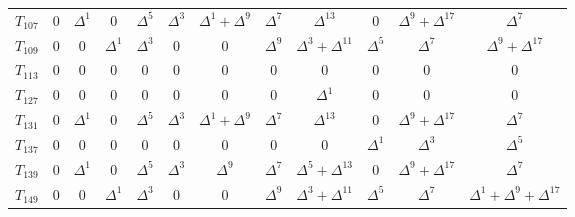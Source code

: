 \begin{center}
\begin{tabular}{|c|ccccccccccc|}
	$T_{107}$ & 0 & $\Delta^1$ & 0 & $\Delta^5$ & $\Delta^3$ & $\Delta^1 + \Delta^9$ & $\Delta^7$ & $\Delta^{13}$ & 0 & $\Delta^9 + \Delta^{17}$ 
	& $\Delta^7$ \\
	$T_{109}$ & 0 & 0 & $\Delta^1$ & $\Delta^3$ & 0 & 0 & $\Delta^9$ & $\Delta^3 + \Delta^{11}$ & $\Delta^5$ & $\Delta^7$ & $\Delta^9 + \Delta^{17}$ \\
	$T_{113}$ & 0 & 0 & 0 & 0 & 0 & 0 & 0 & 0 & 0 & 0 & 0 \\
	$T_{127}$ & 0 & 0 & 0 & 0 & 0 & 0 & 0 & $\Delta^1$ & 0 & 0 & 0 \\
	$T_{131}$ & 0 & $\Delta^1$ & 0 & $\Delta^5$ & $\Delta^3$ & $\Delta^1 + \Delta^9$ & $\Delta^7$ & $\Delta^{13}$ & 0 & $\Delta^9 + \Delta^{17}$ 
	& $\Delta^7$ \\
	$T_{137}$ & 0 & 0 & 0 & 0 & 0 & 0 & 0 & 0 & $\Delta^1$ & $\Delta^3$ & $\Delta^5$ \\
	$T_{139}$ & 0 & $\Delta^1$ & 0 & $\Delta^5$ & $\Delta^3$ & $\Delta^9$ & $\Delta^7$ & $\Delta^5 + \Delta^{13}$ & 0 & $\Delta^9 + \Delta^{17}$ 
	& $\Delta^7$ \\
	$T_{149}$ & 0 & 0 & $\Delta^1$ & $\Delta^3$ & 0 & 0 & $\Delta^9$ & $\Delta^3 + \Delta^{11}$ & $\Delta^5$ & $\Delta^7$ & $\Delta^1 + \Delta^9 
	+ \Delta^{17}$ \\

\end{tabular}
\end{center}
